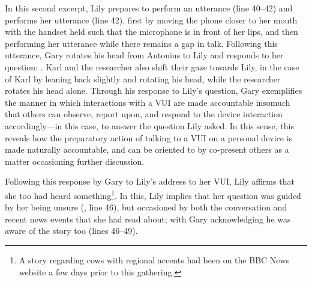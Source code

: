 \begin{revisedsubmission}
In this second excerpt, Lily prepares to perform an utterance (line 40--42) and performs her utterance (line 42), first by moving the phone closer to her mouth with the handset held such that the microphone is in front of her lips, and then performing her utterance while there remains a gap in talk.
Following this utterance, Gary rotates his head from Antonius to Lily and responds to her question: .
Karl and the researcher also shift their gaze towards Lily, in the case of Karl by leaning back slightly and rotating his head, while the researcher rotates his head alone.
Through his response to Lily's question, Gary exemplifies the manner in which interactions with a \ac{VUI} are made accountable insomuch that others can observe, report upon, and respond to the device interaction accordingly---in this case, to answer the question Lily asked.
In this sense, this reveals how the preparatory action of talking to a \ac{VUI} on a personal device is made naturally accountable, and can be oriented to by co-present others as a matter occasioning further discussion.

Following this response by Gary to Lily's address to her \ac{VUI}, Lily affirms that she too had heard something\footnote{A story regarding cows with regional accents had been on the BBC News website a few days prior to this gathering.}.
In this, Lily implies that her question was guided by her being unsure (, line 46), but occasioned by both the conversation and recent news events that she had read about; with Gary acknowledging he was aware of the story too (lines 46--49).
\end{revisedsubmission}







